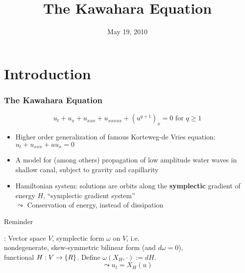 \documentclass[pdftex,10pt,intlimits]{beamer}
\title{The Kawahara Equation}
\author{ \inst{1} \and }%
\institute
{
  \inst{1}%
}
\date{May 19, 2010}
\begin{document}
\begin{frame}
 \titlepage
\end{frame}


\section{Introduction}

\begin{frame}
  \frametitle{The Kawahara Equation}
  \begin{block}{}
  $$u_t + u_x + u_{xxx} + u_{xxxxx} + (u^{q+1})_x = 0 \mbox{ for } q\ge 1$$
  \end{block}
  \begin{itemize}
   \item Higher order generalization of famous Korteweg-de Vries equation:\\ \hspace{2.5cm} $u_t + u_{xxx} + uu_x = 0$
   \item A model for (among others) propagation of low amplitude water waves in shallow canal, subject to gravity and
capillarity
   \item Hamiltonian system: solutions are orbits along the {\bf symplectic} gradient of
energy $H$, ``symplectic gradient system''\\
$\leadsto$ Conservation of energy, instead of dissipation
  \end{itemize}
\begin{block}{}
{\begin{bf} Reminder\end{bf}}: Vector space $V$, symplectic form $\omega$ on $V$, i.e.\\
\vspace{0.15cm}
\hspace{0.5cm} nondegenerate, skew-symmetric bilinear form (and $d\omega=0$),\\
\vspace{0.15cm} functional $H: V\rightarrow {\{{R}\}}$. Define
$\omega(X_H,\cdot) := dH$.
$$\leadsto u_t=X_H(u)$$
\end{block}
\end{frame}
\end{document}
